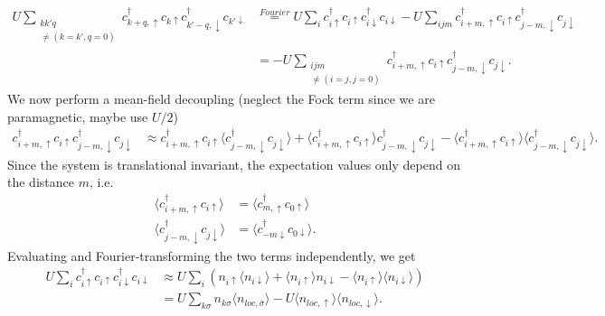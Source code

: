 \documentclass[12pt,a4paper]{scrartcl}
\numberwithin{equation}{section}
\begin{document}
\begin{align}
 U \sum_{\substack{kk'q \\ \neq(k=k',q=0) } } c^{\dagger}_{k+q,\uparrow} c_{k\uparrow}  c^{\dagger}_{k'-q,\downarrow}c_{k'\downarrow} 
 &\stackrel{Fourier}{=}
   U \sum_{i} c^{\dagger}_{i\uparrow} c_{i\uparrow}  c^{\dagger}_{i\downarrow}c_{i\downarrow}
 -U\sum_{ijm}  c^{\dagger}_{i+m,\uparrow} c_{i\uparrow}  c^{\dagger}_{j-m,\downarrow}c_{j\downarrow} \nonumber \\
 &= -U \sum_{\substack{ijm \\ \neq(i=j,j=0) } } c^{\dagger}_{i+m,\uparrow} c_{i\uparrow}  c^{\dagger}_{j-m,\downarrow}c_{j\downarrow}.
\end{align}
We now perform a mean-field decoupling (neglect the Fock term since we are paramagnetic, maybe use $U/2$)
\begin{align}
 c^{\dagger}_{i+m,\uparrow} c_{i\uparrow}  c^{\dagger}_{j-m,\downarrow}c_{j\downarrow}
&\approx c^{\dagger}_{i+m,\uparrow}  c_{i\uparrow} \langle c^{\dagger}_{j-m,\downarrow}c_{j\downarrow}  \rangle
      + \langle c^{\dagger}_{i+m,\uparrow} c_{i\uparrow}  \rangle c^{\dagger}_{j-m,\downarrow}c_{j\downarrow}
      - \langle c^{\dagger}_{i+m,\uparrow} c_{i\uparrow} \rangle \langle c^{\dagger}_{j-m,\downarrow}c_{j\downarrow} \rangle.
\end{align}
Since the system is translational invariant, the expectation values only depend on the distance $m$, i.e.
\begin{align}
\langle c^{\dagger}_{i+m,\uparrow} c_{i\uparrow}  \rangle
&= \langle c^{\dagger}_{m,\uparrow} c_{0\uparrow}  \rangle \nonumber \\
%
 \langle c^{\dagger}_{j-m,\downarrow}c_{j\downarrow}  \rangle
 &= \langle c^{\dagger}_{-m\downarrow}c_{0\downarrow}  \rangle.
\end{align}
Evaluating and Fourier-transforming the two terms independently, we get
\begin{align}
U \sum_{i} c^{\dagger}_{i\uparrow} c_{i\uparrow}  c^{\dagger}_{i\downarrow}c_{i\downarrow}
&\approx U \sum_{i}\left(  n_{i\uparrow}  \langle n_{i\downarrow} \rangle
                          +\langle n_{i\uparrow} \rangle n_{i\downarrow}
                          - \langle n_{i\uparrow} \rangle \langle n_{i\downarrow} \rangle  \right) \nonumber \\
%
&= U \sum_{k\sigma}  n_{k\sigma}  \langle n_{loc,\bar{\sigma}} \rangle
 - U \langle n_{loc,\uparrow} \rangle \langle n_{loc,\downarrow} \rangle.
\end{align}
\end{document}
